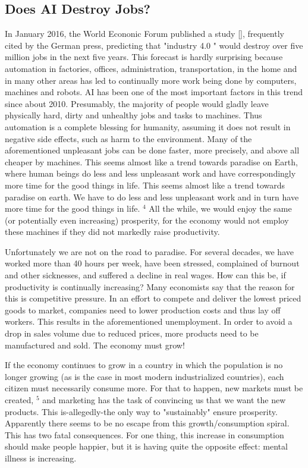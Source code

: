 \documentclass[10pt]{book}
\begin{document}
\subsection{Does AI Destroy Jobs?}
In January 2016, the World Econonic Forum published a study [\cite{schwab2016futurejobs}], frequently cited by the German press, predicting that "industry 4.0 " would destroy over five million jobs in the next five years. This forecast is hardly surprising because automation in factories, offices, administration, transportation, in the home and in many other areas has led to continually more work being done by computers, machines and robots. AI has been one of the most important factors in this trend since about 2010.
Presumably, the majority of people would gladly leave physically hard, dirty and unhealthy jobs and tasks to machines. Thus automation is a complete blessing for humanity, assuming it does not result in negative side effects, such as harm to the environment. Many of the aforementioned unpleasant jobs can be done faster, more precisely, and above all cheaper by machines. This seems almost like a trend towards paradise on Earth, where human beings do less and less unpleasant work and have correspondingly more time for the good things in life. This seems almost like a trend towards paradise on earth. We have to do less and less unpleasant work and in turn have more time for the good things in life. ${ }^{4}$ All the while, we would enjoy the same (or potentially even increasing) prosperity, for the economy would not employ these machines if they did not markedly raise productivity.

Unfortunately we are not on the road to paradise. For several decades, we have worked more than 40 hours per week, have been stressed, complained of burnout and other sicknesses, and suffered a decline in real wages. How can this be, if productivity is continually increasing? Many economists say that the reason for this is competitive pressure. In an effort to compete and deliver the lowest priced goods to market, companies need to lower production costs and thus lay off workers. This results in the aforementioned unemployment. In order to avoid a drop in sales volume due to reduced prices, more products need to be manufactured and sold. The economy must grow!

If the economy continues to grow in a country in which the population is no longer growing (as is the case in most modern industrialized countries), each citizen must necessarily consume more. For that to happen, new markets must be created, ${ }^{5}$ and marketing has the task of convincing us that we want the new products. This is-allegedly-the only way to "sustainably" ensure prosperity. Apparently there seems to be no escape from this growth/consumption spiral. This has two fatal consequences. For one thing, this increase in consumption should make people happier, but it is having quite the opposite effect: mental illness is increasing.
\end{document}

